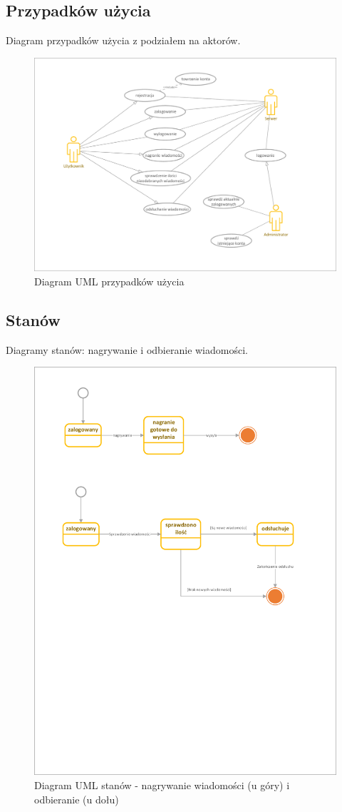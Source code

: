 \documentclass[12pt,a4paper]{article}
\begin{document}
	\subsection{Przypadków użycia}
	\par Diagram przypadków użycia z podziałem na aktorów. 
	\begin{figure}[h!]
		\begin{center}
			\includegraphics*[width=.8\textwidth]{UML_przypadki_uzycia.pdf}
		\end{center}
		\caption{Diagram UML przypadków użycia}
	\end{figure}
	
	\pagebreak
	\subsection{Stanów}
	\par Diagramy stanów: nagrywanie i odbieranie wiadomości.

	\begin{figure}[h!]
		\begin{center}
			\includegraphics*[width=.75\textwidth]{UML_stan_rozmowa.pdf}
		\end{center}
		\caption{Diagram UML stanów - nagrywanie wiadomości (u góry) i odbieranie (u dołu)}
	\end{figure}
	
\end{document}

